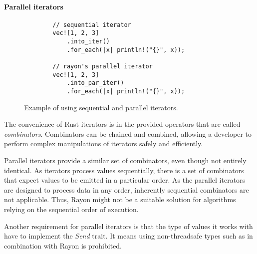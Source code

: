 \paragraph{Parallel iterators}
\begin{figure}[!htbp]
    \centering

    \begin{verbatim}
        // sequential iterator
        vec![1, 2, 3]
            .into_iter()
            .for_each(|x| println!("{}", x));

        // rayon's parallel iterator
        vec![1, 2, 3]
            .into_par_iter()
            .for_each(|x| println!("{}", x));
    \end{verbatim}

    \caption{Example of using sequential and parallel iterators.}
    \label{fig:par-iter-example}
\end{figure}

The convenience of Rust iterators is in the provided operators that are called \emph{combinators}. Combinators can be chained and combined, allowing a developer to perform complex manipulations of iterators safely and efficiently.

Parallel iterators provide a similar set of combinators, even though not entirely identical. As iterators process values sequentially, there is a set of combinators that expect values to be emitted in a particular order. As the parallel iterators are designed to process data in any order, inherently sequential combinators are not applicable. Thus, Rayon might not be a suitable solution for algorithms relying on the sequential order of execution.

Another requirement for parallel iterators is that the type of values it works with have to implement the \emph{Send} trait. It means using non-threadsafe types such as \rc{} in combination with Rayon is prohibited.

